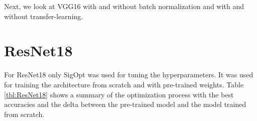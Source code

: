 Next, we look at VGG16 with and without batch normalization and with and without transfer-learning.

\begin{table}[h] \centering
{}
\caption{Hyper parameters for VGG16 and VGG16 with Batch Normalization (bn) optimized with SigOpt. First row shows hyperparameters training the architecture from scratch. Second row used pre-trained weights from ImageNet}
\label{tbl:VGG16}
\end{table}












\section{ResNet18}

For ResNet18 only SigOpt was used for tuning the hyperparameters. It was used for training the architecture from scratch and with pre-trained weights. Table \ref{tbl:ResNet18} shows a summary of the optimization process with the best accuracies and the delta between the pre-trained model and the model trained from scratch.

\begin{table}[h] \centering
{}
\caption{Hyper parameters for ResNet18 optimized with SigOpt. First row shows hyperparameters training the architecture from scratch. Second row used pre-trained weights from ImageNet}
\label{tbl:ResNet18}
\end{table}

